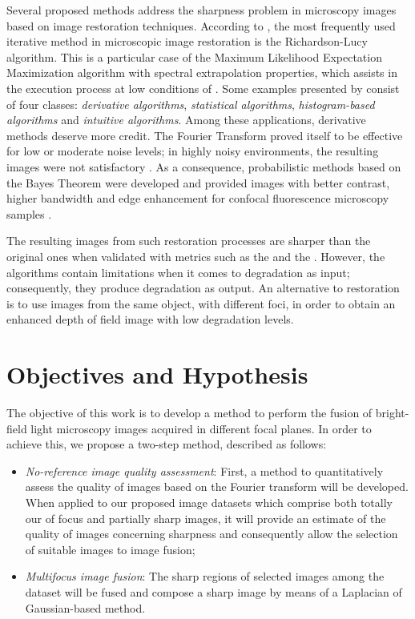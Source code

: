 Several proposed methods address the sharpness problem in microscopy images based on image restoration techniques. According to , the most frequently used iterative method in microscopic image restoration is the Richardson-Lucy algorithm. This is a particular case of the Maximum Likelihood Expectation Maximization algorithm with spectral extrapolation properties, which assists in the execution process at low conditions of . Some examples presented by  consist of
four classes: \emph{derivative algorithms}, \emph{statistical algorithms}, \emph{histogram-based algorithms} and \emph{intuitive algorithms}. Among these applications, derivative methods deserve more credit. The Fourier Transform proved itself to be
effective for low or moderate noise levels; in highly noisy environments, the resulting images were not satisfactory \cite{richardson1972bayesian}. As a consequence, probabilistic methods based on the Bayes Theorem were developed and provided images with better contrast, higher bandwidth and
edge enhancement for confocal fluorescence microscopy samples \cite{ponti2016image}.

The resulting images from such restoration processes are sharper than the original ones when validated with metrics such as the  and the . However, the algorithms contain limitations when it comes to degradation as input; consequently, they produce degradation as output. An alternative to restoration is to use images from the same object, with different foci, in order to obtain an enhanced depth of field image with low degradation levels.

\section{Objectives and Hypothesis}

The objective of this work is to develop a method to perform the fusion of bright-field light microscopy images acquired in different focal planes. In order to achieve this, we propose a two-step method, described as follows:

\begin{itemize}
    \item \emph{No-reference image quality assessment}: First, a method to quantitatively assess the quality of images based on the Fourier transform will be developed. When applied to our proposed image datasets which comprise both totally our of focus and partially sharp images, it will provide an estimate of the quality of images concerning sharpness and consequently allow the selection of suitable images to image fusion;
    
    \item \emph{Multifocus image fusion}: The sharp regions of selected images among the dataset will be fused and compose a sharp image by means of a Laplacian of Gaussian-based method.
    
\end{itemize}

